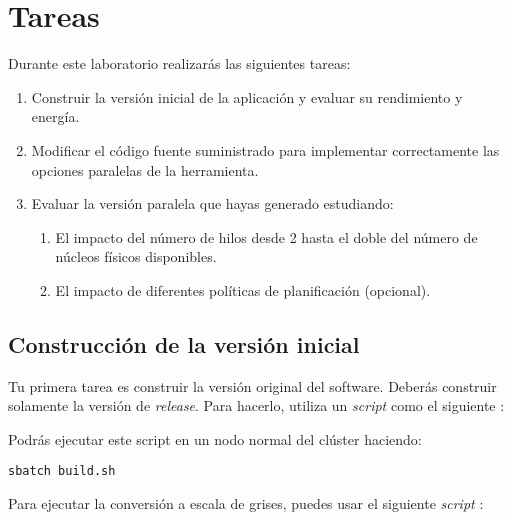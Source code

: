 \section{Tareas}

Durante este laboratorio realizarás las siguientes tareas:

\begin{enumerate}

\item Construir la versión inicial de la aplicación y evaluar su rendimiento y energía.

\item Modificar el código fuente suministrado para implementar correctamente las
opciones paralelas de la herramienta.

\item Evaluar la versión paralela que hayas generado estudiando:

\begin{enumerate}
  \item El impacto del número de hilos desde 2 hasta el doble del número de
núcleos físicos disponibles.

  \item El impacto de diferentes políticas de planificación (opcional).
\end{enumerate}

\end{enumerate}

\subsection{Construcción de la versión inicial}

Tu primera tarea es construir la versión original del software. Deberás
construir solamente la versión de \emph{release}. Para hacerlo, utiliza un
\emph{script} como el siguiente :



Podrás ejecutar este script en un nodo normal del clúster haciendo:

\begin{lstlisting}[style=terminal]
sbatch build.sh
\end{lstlisting}

Para ejecutar la conversión a escala de grises, puedes usar el siguiente
\emph{script} :



